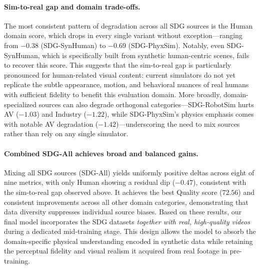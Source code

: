\paragraph{Sim-to-real gap and domain trade-offs.}
The most consistent pattern of degradation across all SDG sources is the Human
domain score, which drops in every single variant without exception---ranging
from $-0.38$ (SDG-SynHuman) to $-0.69$ (SDG-PhyxSim). Notably, even
SDG-SynHuman, which is specifically built from synthetic human-centric scenes,
fails to recover this score. This suggests that the sim-to-real gap is
particularly pronounced for human-related visual content: current simulators do
not yet replicate the subtle appearance, motion, and behavioral nuances of real
humans with sufficient fidelity to benefit this evaluation domain. More broadly,
domain-specialized sources can also degrade orthogonal categories---SDG-RobotSim
hurts AV ($-1.03$) and Industry ($-1.22$), while SDG-PhyxSim's physics emphasis
comes with notable AV degradation ($-1.42$)---underscoring the need to mix
sources rather than rely on any single simulator.


\paragraph{Combined SDG-All achieves broad and balanced gains.}
Mixing all SDG sources (SDG-All) yields uniformly positive deltas across eight
of nine metrics, with only Human showing a residual dip ($-0.47$), consistent
with the sim-to-real gap observed above. It achieves the best Quality score
($72.56$) and consistent improvements across all other domain categories,
demonstrating that data diversity suppresses individual source biases. Based on
these results, our final model incorporates the SDG datasets \emph{together with real, high-quality videos} during a dedicated mid-training stage. This design allows the model to absorb the domain-specific physical
understanding encoded in synthetic data while retaining the perceptual fidelity
and visual realism it acquired from real footage in pre-training.
